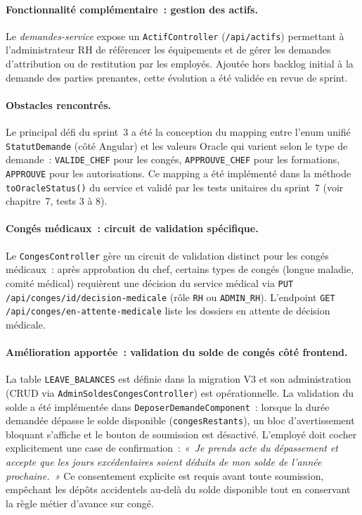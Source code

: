 \paragraph{Fonctionnalité complémentaire~: gestion des actifs.}
Le \textit{demandes-service} expose un \texttt{ActifController} (\texttt{/api/actifs}) permettant à l'administrateur RH de référencer les équipements et de gérer les demandes d'attribution ou de restitution par les employés. Ajoutée hors backlog initial à la demande des parties prenantes, cette évolution a été validée en revue de sprint.

\paragraph{Obstacles rencontrés.}
Le principal défi du sprint~3 a été la conception du mapping entre l'enum unifié
\texttt{StatutDemande} (côté Angular) et les valeurs Oracle qui varient selon le
type de demande~: \texttt{VALIDE\_CHEF} pour les congés, \texttt{APPROUVE\_CHEF}
pour les formations, \texttt{APPROUVE} pour les autorisations. Ce mapping a été
implémenté dans la méthode \texttt{toOracleStatus()} du service et validé par
les tests unitaires du sprint~7 (voir chapitre~7, tests 3 à 8).

\paragraph{Congés médicaux~: circuit de validation spécifique.}
Le \texttt{CongesController} gère un circuit de validation distinct pour les
congés médicaux~: après approbation du chef, certains types de congés (longue
maladie, comité médical) requièrent une décision du service médical via
\texttt{PUT /api/conges/{id}/decision-medicale} (rôle \texttt{RH} ou
\texttt{ADMIN\_RH}). L'endpoint \texttt{GET /api/conges/en-attente-medicale}
liste les dossiers en attente de décision médicale.

\paragraph{Amélioration apportée~: validation du solde de congés côté frontend.}
La table \texttt{LEAVE\_BALANCES} est définie dans la migration V3 et son administration
(CRUD via \texttt{AdminSoldesCongesController}) est opérationnelle. La validation
du solde a été implémentée dans \texttt{DeposerDemandeComponent}~: lorsque la durée
demandée dépasse le solde disponible (\texttt{congesRestants}), un bloc d'avertissement
bloquant s'affiche et le bouton de soumission est désactivé. L'employé doit cocher
explicitement une case de confirmation~:
\textit{«~Je prends acte du dépassement et accepte que les jours excédentaires soient
déduits de mon solde de l'année prochaine.~»}
Ce consentement explicite est requis avant toute soumission, empêchant les dépôts
accidentels au-delà du solde disponible tout en conservant la règle métier d'avance
sur congé.

